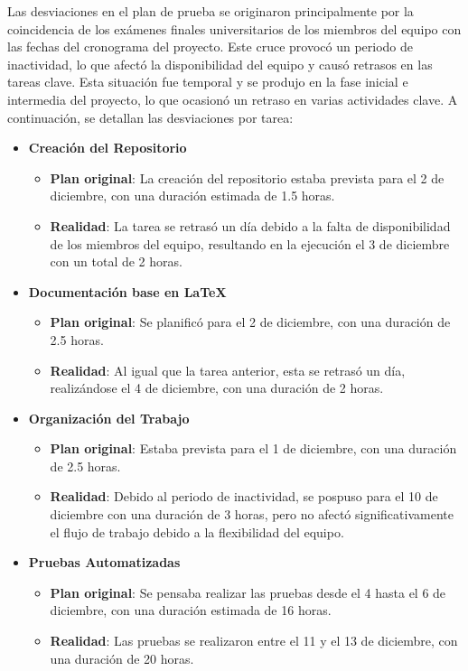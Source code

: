 \documentclass[stu, 12pt, letterpaper, donotrepeattitle, floatsintext, natbib]{apa7}
\begin{document}
Las desviaciones en el plan de prueba se originaron principalmente por la coincidencia de los exámenes finales universitarios de los miembros del equipo con las fechas del cronograma del proyecto. Este cruce provocó un periodo de inactividad, lo que afectó la disponibilidad del equipo y causó retrasos en las tareas clave. 
Esta situación fue temporal y se produjo en la fase inicial e intermedia del proyecto, lo que ocasionó un retraso en varias actividades clave.
A continuación, se detallan las desviaciones por tarea:

\begin{itemize}
    \item \textbf{Creación del Repositorio}  
    \begin{itemize}
        \item \textbf{Plan original}: La creación del repositorio estaba prevista para el 2 de diciembre, con una duración estimada de 1.5 horas.
        \item \textbf{Realidad}: La tarea se retrasó un día debido a la falta de disponibilidad de los miembros del equipo, resultando en la ejecución el 3 de diciembre con un total de 2 horas.
    \end{itemize}

    \item \textbf{Documentación base en LaTeX}  
    \begin{itemize}
        \item \textbf{Plan original}: Se planificó para el 2 de diciembre, con una duración de 2.5 horas.
        \item \textbf{Realidad}: Al igual que la tarea anterior, esta se retrasó un día, realizándose el 4 de diciembre, con una duración de 2 horas.
    \end{itemize}

    \item \textbf{Organización del Trabajo}  
    \begin{itemize}
        \item \textbf{Plan original}: Estaba prevista para el 1 de diciembre, con una duración de 2.5 horas.
        \item \textbf{Realidad}: Debido al periodo de inactividad, se pospuso para el 10 de diciembre con una duración de 3 horas, pero no afectó significativamente el flujo de trabajo debido a la flexibilidad del equipo.
    \end{itemize}

    \item \textbf{Pruebas Automatizadas}  
    \begin{itemize}
        \item \textbf{Plan original}: Se pensaba realizar las pruebas desde el 4 hasta el 6 de diciembre, con una duración estimada de 16 horas.
        \item \textbf{Realidad}: Las pruebas se realizaron entre el 11 y el 13 de diciembre, con una duración de 20 horas.
    \end{itemize}


\end{itemize}
\end{document}
